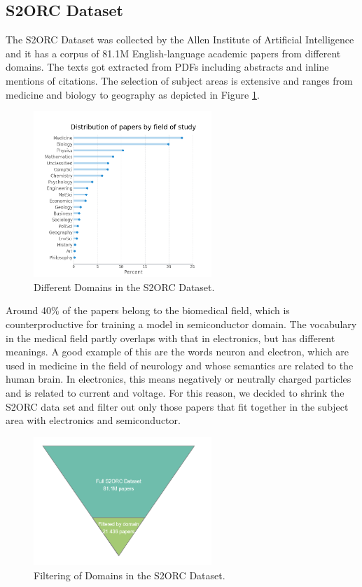 \subsection{S2ORC Dataset}
The S2ORC Dataset was collected by the Allen Institute of Artificial  Intelligence  and  it  has  a  corpus  of 81.1M  English-language academic papers from different domains. The texts  got  extracted  from  PDFs  including  abstracts  and  inline mentions of citations. The selection of subject areas is extensive and ranges from medicine and biology to geography as depicted in Figure \ref{fig:domains}.

\begin{figure}[H]
	\centering
	\includegraphics[width=0.6\textwidth]{figures/S2ORC_Domains.PNG}
	\caption{Different Domains in the S2ORC Dataset.}
	\label{fig:domains}
\end{figure}

Around 40\% of the papers belong to the  biomedical field, which is counterproductive for training a model in semiconductor domain. The vocabulary in the medical field partly overlaps with that in electronics, but has different meanings. A good example of this are the words neuron and electron, which are used in medicine in the field of neurology and whose semantics are related to the human brain. In electronics, this means negatively or neutrally charged particles and is related to current and voltage. For this reason, we decided to shrink the S2ORC data set and filter out only those papers that fit together in the subject area with electronics and semiconductor.

\begin{figure}[H]
	\centering
	\includegraphics[width=0.6\textwidth]{figures/s2orc_filtered.PNG}
	\caption{Filtering of Domains in the S2ORC Dataset.}
	\label{fig:filtered_domains}
\end{figure}


